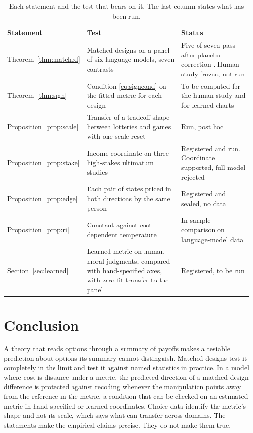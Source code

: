 \documentclass[11pt]{article}
\theoremstyle{definition}
\begin{document}
\begin{table}[t]
\centering
\small
\caption{Each statement and the test that bears on it. The last column states what has been run.}
\label{tab:map}
\begin{tabular}{@{}p{}p{}p{}@{}}
\toprule
Statement & Test & Status \\
\midrule
Theorem~\ref{thm:matched} & Matched designs on a panel of six language models, seven contrasts & Five of seven pass after placebo correction \citep{BondPartII}. Human study frozen, not run \\
Theorem~\ref{thm:sign} & Condition \eqref{eq:signcond} on the fitted metric for each design & To be computed for the human study and for learned charts \\
Proposition~\ref{prop:scale} & Transfer of a tradeoff shape between lotteries and games with one scale reset & Run, post hoc \citep{BondPartII} \\
Proposition~\ref{prop:stake} & Income coordinate on three high-stakes ultimatum studies & Registered and run. Coordinate supported, full model rejected \citep{BondPartII} \\
Proposition~\ref{prop:edge} & Each pair of states priced in both directions by the same person & Registered and sealed, no data \\
Proposition~\ref{prop:ri} & Constant against cost-dependent temperature & In-sample comparison on language-model data \citep{BondPartII} \\
Section~\ref{sec:learned} & Learned metric on human moral judgments, compared with hand-specified axes, with zero-fit transfer to the panel & Registered, to be run \\
\bottomrule
\end{tabular}
\end{table}

\section{Conclusion}

A theory that reads options through a summary of payoffs makes a testable prediction about options its summary cannot distinguish.
Matched designs test it completely in the limit and test it against named statistics in practice.
In a model where cost is distance under a metric, the predicted direction of a matched-design difference is protected against recoding whenever the manipulation points away from the reference in the metric, a condition that can be checked on an estimated metric in hand-specified or learned coordinates.
Choice data identify the metric's shape and not its scale, which says what can transfer across domains.
The statements make the empirical claims precise.
They do not make them true.
\end{document}
